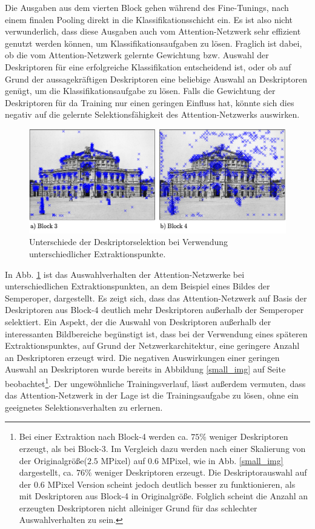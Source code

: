 Die Ausgaben aus dem vierten Block gehen während des Fine-Tunings, nach einem finalen Pooling direkt in die Klassifikationsschicht ein. Es ist also nicht verwunderlich, dass diese Ausgaben auch vom Attention-Netzwerk sehr effizient genutzt werden können, um Klassifikationsaufgaben zu lösen. Fraglich ist dabei, ob die vom Attention-Netzwerk gelernte Gewichtung bzw. Auswahl der Deskriptoren für eine erfolgreiche Klassifikation entscheidend ist, oder ob auf Grund der aussagekräftigen Deskriptoren eine beliebige Auswahl an Deskriptoren genügt, um die Klassifikationsaufgabe zu lösen. Falls die Gewichtung der Deskriptoren für da Training nur einen geringen Einfluss hat, könnte sich dies negativ auf die gelernte Selektionsfähigkeit des Attention-Netzwerks auswirken.
\\


\begin{figure}[h]
\centering
\includegraphics[scale=0.79]{attention_layer_diff}
\caption{Unterschiede der Deskriptorselektion bei Verwendung unterschiedlicher Extraktionspunkte.}
\label{attention_layer_diff}
\end{figure}
In Abb. \ref{attention_layer_diff} ist das Auswahlverhalten der Attention-Netzwerke bei unterschiedlichen Extraktionspunkten, an dem Beispiel eines Bildes der Semperoper, dargestellt. Es zeigt sich, dass das Attention-Netzwerk auf Basis der Deskriptoren aus Block-4 deutlich mehr Deskriptoren außerhalb der Semperoper selektiert.
Ein Aspekt, der die Auswahl von Deskriptoren außerhalb der interessanten Bildbereiche begünstigt ist, dass bei der Verwendung eines späteren Extraktionspunktes, auf Grund der Netzwerkarchitektur, eine geringere Anzahl an Deskriptoren erzeugt wird. Die negativen Auswirkungen einer geringen Auswahl an Deskriptoren wurde bereits in Abbildung \ref{small_img} auf Seite \pageref{small_img} beobachtet\footnote{Bei einer Extraktion nach Block-4 werden ca. $75 \%$ weniger Deskriptoren erzeugt, als bei Block-3. Im Vergleich dazu werden nach einer Skalierung von der Originalgröße($2.5$ MPixel) auf $0.6$ MPixel, wie in Abb. \ref{small_img} dargestellt, ca. $76 \%$ weniger Deskriptoren erzeugt. Die Deskriptorauswahl auf der $0.6$ MPixel Version scheint jedoch deutlich besser zu funktionieren, als mit Deskriptoren aus Block-4 in Originalgröße. Folglich scheint die Anzahl an erzeugten Deskriptoren nicht alleiniger Grund für das schlechter Auswahlverhalten zu sein.}. Der ungewöhnliche Trainingsverlauf, lässt außerdem vermuten, dass das Attention-Netzwerk in der Lage ist die Trainingsaufgabe zu lösen, ohne ein geeignetes Selektionsverhalten zu erlernen.
